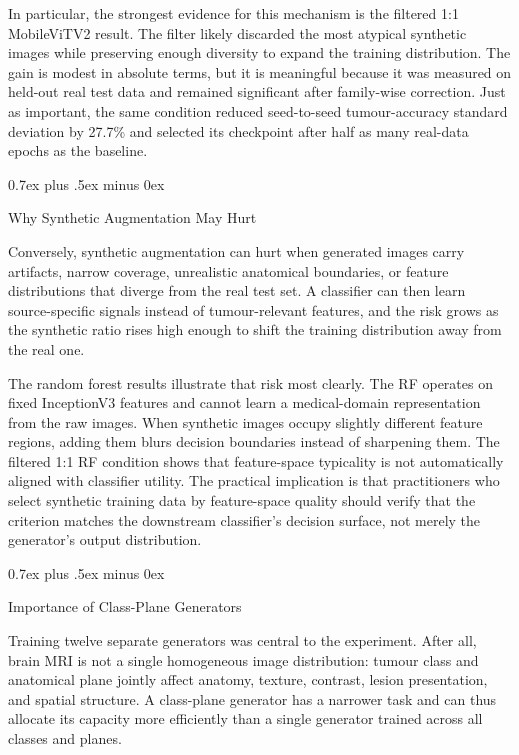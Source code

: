 \documentclass[conference,twoside]{IEEEtran}
\makeatletter
\newcommand{\bodyfont}{\rmfamily}
\def\subsection{\@startsection{subsection}{2}{\z@}{1.5ex plus 1.5ex minus 0.5ex}%
{0.7ex plus .5ex minus 0ex}{\normalfont\normalsize\bodyfont\bfseries\raggedright}}
\makeatother
\begin{document}
In particular, the strongest evidence for this mechanism is the filtered 1:1 MobileViTV2 result. The filter likely discarded the most atypical synthetic images while preserving enough diversity to expand the training distribution. The gain is modest in absolute terms, but it is meaningful because it was measured on held-out real test data and remained significant after family-wise correction. Just as important, the same condition reduced seed-to-seed tumour-accuracy standard deviation by 27.7\% and selected its checkpoint after half as many real-data epochs as the baseline.

\subsection{Why Synthetic Augmentation May Hurt}

Conversely, synthetic augmentation can hurt when generated images carry artifacts, narrow coverage, unrealistic anatomical boundaries, or feature distributions that diverge from the real test set. A classifier can then learn source-specific signals instead of tumour-relevant features, and the risk grows as the synthetic ratio rises high enough to shift the training distribution away from the real one.

The random forest results illustrate that risk most clearly. The RF operates on fixed InceptionV3 features and cannot learn a medical-domain representation from the raw images. When synthetic images occupy slightly different feature regions, adding them blurs decision boundaries instead of sharpening them. The filtered 1:1 RF condition shows that feature-space typicality is not automatically aligned with classifier utility. The practical implication is that practitioners who select synthetic training data by feature-space quality should verify that the criterion matches the downstream classifier's decision surface, not merely the generator's output distribution.

\subsection{Importance of Class-Plane Generators}

Training twelve separate generators was central to the experiment. After all, brain MRI is not a single homogeneous image distribution: tumour class and anatomical plane jointly affect anatomy, texture, contrast, lesion presentation, and spatial structure. A class-plane generator has a narrower task and can thus allocate its capacity more efficiently than a single generator trained across all classes and planes.
\end{document}
